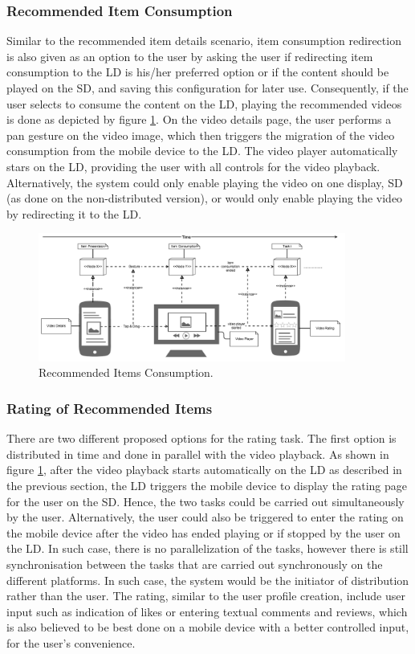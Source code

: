 \subsubsection{Recommended Item Consumption}
Similar to the recommended item details scenario, item consumption redirection is also given as an option to the user by asking the user if redirecting item consumption to the LD is his/her preferred option or if the content should be played on the SD, and saving this configuration for later use. Consequently, if the user selects to consume the content on the LD, playing the recommended videos is done as depicted by figure \ref{fig:figure36}. On the video details page, the user performs a pan gesture on the video image,  which then triggers the migration of the video consumption from the mobile device to the LD. The video player automatically stars on the LD, providing the user with all controls for the video playback.  
Alternatively, the system could only enable playing the video on one display, SD (as done on the non-distributed version), or would only enable playing the video by redirecting it to the LD. 
\begin{figure}[!htpb]
\includegraphics[width=0.9\textwidth, center, center]{figures/playrate}
\caption{Recommended Items Consumption.}
\label{fig:figure36}
\end{figure}
\subsubsection{Rating of Recommended Items}
There are two different proposed options for the rating task. The first option
is distributed in time and done in parallel with the video playback. As shown in figure \ref{fig:figure36}, after the video playback starts automatically on the LD as described in the previous section, the LD triggers the mobile device to display the rating page for the user on the SD. Hence, the two tasks could be carried out simultaneously by the user.
Alternatively, the user could also be triggered to enter the rating on the mobile device after the video has ended playing or if stopped by the user on the LD. In such case, there is no parallelization of the tasks, however there is still synchronisation between the tasks that are carried out synchronously on the different platforms. In such case, the system would be the initiator of distribution rather than the user.
The rating, similar to the user profile creation, include user input such as indication of likes or entering textual comments and reviews, which is also believed to be best done on a mobile device with a better controlled input, for the user's convenience.  

